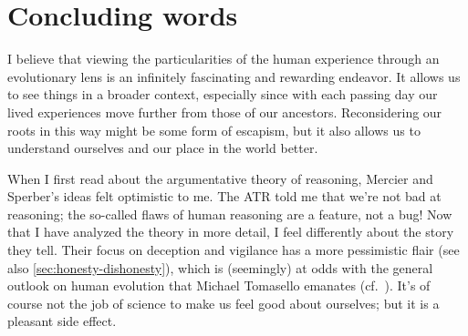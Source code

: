 \section{Concluding words}
I believe that viewing the particularities of the human experience through an evolutionary lens is an infinitely fascinating and rewarding endeavor. It allows us to see things in a broader context, especially since with each passing day our lived experiences move further from those of our ancestors. Reconsidering our roots in this way might be some form of escapism, but it also allows us to understand ourselves and our place in the world better.

When I first read about the argumentative theory of reasoning, Mercier and Sperber's ideas felt optimistic to me. The ATR told me that we're not bad at reasoning; the so-called flaws of human reasoning are a feature, not a bug! Now that I have analyzed the theory in more detail, I feel differently about the story they tell. Their focus on deception and vigilance has a more pessimistic flair (see also \cref{sec:honesty-dishonesty}), which is (seemingly) at odds with the general outlook on human evolution that Michael Tomasello emanates (cf.~\citet{Tomasello09}). It's of course not the job of science to make us feel good about ourselves; but it is a pleasant side effect.
